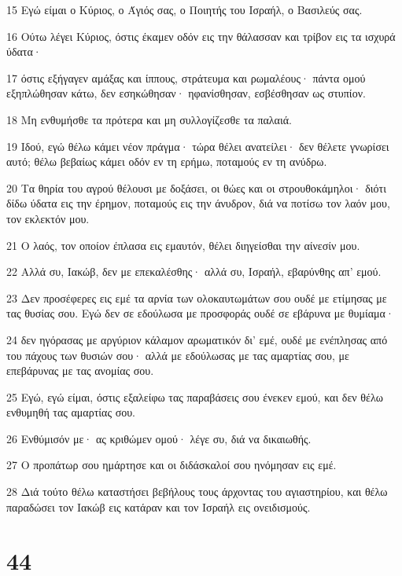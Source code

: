 \par 15 Εγώ είμαι ο Κύριος, ο Άγιός σας, ο Ποιητής του Ισραήλ, ο Βασιλεύς σας.
\par 16 Ούτω λέγει Κύριος, όστις έκαμεν οδόν εις την θάλασσαν και τρίβον εις τα ισχυρά ύδατα·
\par 17 όστις εξήγαγεν αμάξας και ίππους, στράτευμα και ρωμαλέους· πάντα ομού εξηπλώθησαν κάτω, δεν εσηκώθησαν· ηφανίσθησαν, εσβέσθησαν ως στυπίον.
\par 18 Μη ενθυμήσθε τα πρότερα και μη συλλογίζεσθε τα παλαιά.
\par 19 Ιδού, εγώ θέλω κάμει νέον πράγμα· τώρα θέλει ανατείλει· δεν θέλετε γνωρίσει αυτό; θέλω βεβαίως κάμει οδόν εν τη ερήμω, ποταμούς εν τη ανύδρω.
\par 20 Τα θηρία του αγρού θέλουσι με δοξάσει, οι θώες και οι στρουθοκάμηλοι· διότι δίδω ύδατα εις την έρημον, ποταμούς εις την άνυδρον, διά να ποτίσω τον λαόν μου, τον εκλεκτόν μου.
\par 21 Ο λαός, τον οποίον έπλασα εις εμαυτόν, θέλει διηγείσθαι την αίνεσίν μου.
\par 22 Αλλά συ, Ιακώβ, δεν με επεκαλέσθης· αλλά συ, Ισραήλ, εβαρύνθης απ' εμού.
\par 23 Δεν προσέφερες εις εμέ τα αρνία των ολοκαυτωμάτων σου ουδέ με ετίμησας με τας θυσίας σου. Εγώ δεν σε εδούλωσα με προσφοράς ουδέ σε εβάρυνα με θυμίαμα·
\par 24 δεν ηγόρασας με αργύριον κάλαμον αρωματικόν δι' εμέ, ουδέ με ενέπλησας από του πάχους των θυσιών σου· αλλά με εδούλωσας με τας αμαρτίας σου, με επεβάρυνας με τας ανομίας σου.
\par 25 Εγώ, εγώ είμαι, όστις εξαλείφω τας παραβάσεις σου ένεκεν εμού, και δεν θέλω ενθυμηθή τας αμαρτίας σου.
\par 26 Ενθύμισόν με· ας κριθώμεν ομού· λέγε συ, διά να δικαιωθής.
\par 27 Ο προπάτωρ σου ημάρτησε και οι διδάσκαλοί σου ηνόμησαν εις εμέ.
\par 28 Διά τούτο θέλω καταστήσει βεβήλους τους άρχοντας του αγιαστηρίου, και θέλω παραδώσει τον Ιακώβ εις κατάραν και τον Ισραήλ εις ονειδισμούς.

\chapter{44}

